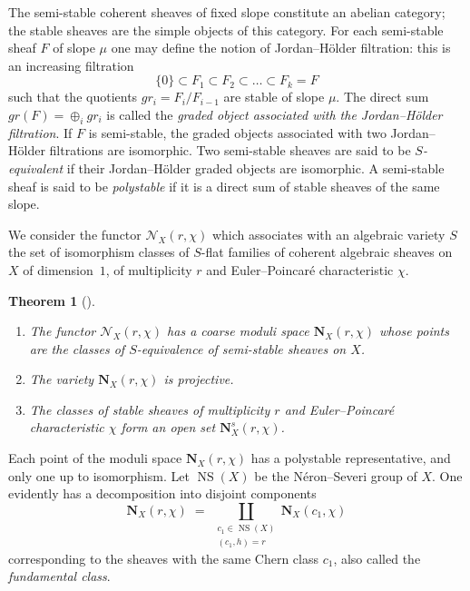 \documentclass[12pt,english]{smfart}%
\theoremstyle{plain}
\newtheorem{theorem}{Theorem}[section]
\theoremstyle{definition}
\theoremstyle{remark}
\newcommand{\NN}{\mathbf{N}}           %
\DeclareMathOperator{\NS}{NS}
\begin{document}
The semi-stable coherent sheaves of fixed slope constitute an abelian category; the stable sheaves are the simple objects of this category. For each semi-stable sheaf $F$ of slope $\mu$ one may define the notion of Jordan--H\"older filtration: this is an increasing filtration
\[
\{0\} \subset F_{1} \subset F_{2} \subset \dots \subset F_{k} = F
\]
such that the quotients $gr_{i}=F_{i}/F_{i-1}$ are stable of slope $\mu$. The direct sum $gr(F)=\oplus_{i} gr_{i}$ is called the \emph{graded object associated with the Jordan--H\"older filtration}. If $F$ is semi-stable, the graded objects associated with two Jordan--H\"older filtrations are isomorphic. Two semi-stable sheaves are said to be \emph{$S$-equivalent} if their Jordan--H\"older graded objects are isomorphic. A semi-stable sheaf is said to be \emph{polystable} if it is a direct sum of stable sheaves of the same slope.

We consider the functor $\mathcal{N}_{X}(r,\chi)$ which associates with an algebraic variety $S$ the set of isomorphism classes of $S$-flat families of coherent algebraic sheaves on $X$ of dimension~$1$, of multiplicity $r$ and Euler--Poincar\'e characteristic $\chi$.

\begin{theorem}[\cite{Sim2}]\label{thm:moduli}
\begin{enumerate}
\item The functor $\mathcal{N}_{X}(r,\chi)$ has a coarse moduli space $\NN_{X}(r,\chi)$ whose points are the classes of $S$-equivalence of semi-stable sheaves on $X$.
\item The variety $\NN_{X}(r,\chi)$ is projective.
\item The classes of stable sheaves of multiplicity $r$ and Euler--Poincar\'e characteristic $\chi$ form an open set $\NN^{s}_{X}(r,\chi)$.
\end{enumerate}
\end{theorem}

Each point of the moduli space $\NN_{X}(r,\chi)$ has a polystable representative, and only one up to isomorphism. Let $\NS(X)$ be the N\'eron--Severi group of $X$. One evidently has a decomposition into disjoint components
\[
\NN_{X}(r,\chi) \;=\; \coprod_{\substack{c_{1}\in \NS(X)\\ (c_{1},h)=r}}
\NN_{X}(c_{1},\chi)
\]
corresponding to the sheaves with the same Chern class $c_{1}$, also called the \emph{fundamental class}.
\end{document}
